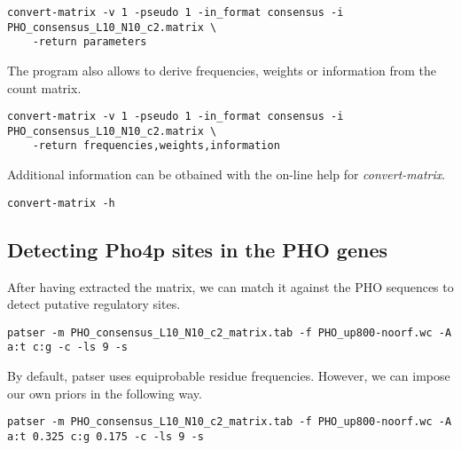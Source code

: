 {\color{Blue} \begin{footnotesize} 
\begin{verbatim}
convert-matrix -v 1 -pseudo 1 -in_format consensus -i PHO_consensus_L10_N10_c2.matrix \
    -return parameters
\end{verbatim} \end{footnotesize}
}

The program  also allows to derive
frequencies, weights or information from the count matrix.

{\color{Blue} \begin{footnotesize} 
\begin{verbatim}
convert-matrix -v 1 -pseudo 1 -in_format consensus -i PHO_consensus_L10_N10_c2.matrix \
    -return frequencies,weights,information
\end{verbatim} \end{footnotesize}
}



Additional information can be otbained with the on-line help for
\textit{convert-matrix}.

{\color{Blue} \begin{footnotesize} 
\begin{verbatim}
convert-matrix -h
\end{verbatim} \end{footnotesize}
}

\subsection{Detecting Pho4p sites in the PHO genes}

After having extracted the matrix, we can match it against the PHO
sequences to detect putative regulatory sites.

{\color{Blue} \begin{footnotesize} 
\begin{verbatim}
patser -m PHO_consensus_L10_N10_c2_matrix.tab -f PHO_up800-noorf.wc -A a:t c:g -c -ls 9 -s
\end{verbatim} \end{footnotesize}
}

By default, patser uses equiprobable residue frequencies. However, we
can impose our own priors in the following way.

{\color{Blue} \begin{footnotesize} 
\begin{verbatim}
patser -m PHO_consensus_L10_N10_c2_matrix.tab -f PHO_up800-noorf.wc -A a:t 0.325 c:g 0.175 -c -ls 9 -s
\end{verbatim} \end{footnotesize}
}

